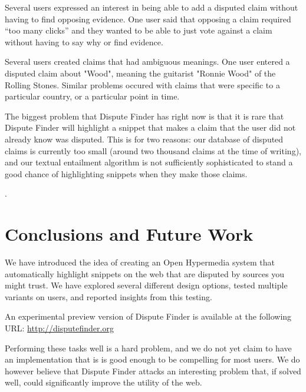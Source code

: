 \documentclass{www2010-submission}
\newcommand{\todo}[1]{}
\begin{document}
Several users expressed an interest in being able to add a disputed claim without having to find opposing evidence. One user said that opposing a claim required ``too many clicks'' and they wanted to be able to just vote against a claim without having to say why or find evidence. 

Several users created claims that had ambiguous meanings. One user entered a disputed claim about "Wood", meaning the guitarist "Ronnie Wood" of the Rolling Stones. Similar problems occured with claims that were specific to a particular country, or a particular point in time. 

The biggest problem that Dispute Finder has right now is that it is rare that Dispute Finder will highlight a snippet that makes a claim that the user did not already know was disputed. This is for two reasons: our database of disputed claims is currently too small (around two thousand claims at the time of writing), and our textual entailment algorithm is not sufficiently sophisticated to stand a good chance of highlighting snippets when they make those claims.

\todo{Need to say that the argumentation graph contains all existing claims and that it was a simple "supports"/"oppsose" graph.}.

\todo{Come up with terminology for marking an evidence snippet, and agree on evidence vs source vs article}
\todo{Talk about how the early versions conflated evidence and snippets - and whether it makes sense to distinguish between them}
\todo{Screenshot of the claim graph interface}


\section{Conclusions and Future Work}

We have introduced the idea of creating an Open Hypermedia system that automatically highlight snippets on the web that are disputed by sources you might trust. We have explored several different design options, tested multiple variants on users, and reported insights from this testing.

An experimental preview version of Dispute Finder is available at the following URL:
\url{http://disputefinder.org}

Performing these tasks well is a hard problem, and we do not yet claim to have an implementation that is is good enough to be compelling for most users. We do however believe that Dispute Finder attacks an interesting problem that, if solved well, could significantly improve the utility of the web.
\end{document}
